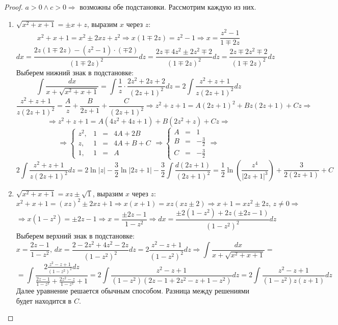 \documentclass[12pt]{article}
\theoremstyle{definition}
\DeclareMathOperator{\dint}{\displaystyle\int}
\begin{document}
\begin{proof}
	$a > 0 \wedge c > 0 \Rightarrow$ возможны обе подстановки. Рассмотрим каждую из них.
	\begin{enumerate}[label=(\arabic*)]
		\item $\sqrt{x^2 + x + 1 } = \pm x + z$, выразим $x$ через $z$:
		$$
			x^2 + x + 1 = x^2 \pm 2xz  + z^2 \Rightarrow x(1 \mp 2z) = z^2 - 1 \Rightarrow x = \dfrac{z^2 -1}{1 \mp 2z}
		$$
		$$	
			dx = \dfrac{2z(1 \mp2z) - (z^2 - 1){\cdot}(\mp 2)}{(1\mp2z)^2}dz = \dfrac{2z \mp 4z^2 \pm 2z^2 \mp 2}{(1 \mp 2z)^2}dz = \dfrac{2z \mp 2z^2  \mp 2}{(1 \mp 2z)^2}dz
		$$
		Выберем нижний знак в подстановке:
		$$
			\dint \dfrac{dx}{x + \sqrt{x^2 + x + 1 }} = \dint \dfrac{1}{z}{\cdot}\dfrac{2z^2 + 2z + 2}{(2z+1)^2}dz = 2\dint \dfrac{z^2 + z + 1}{z(2z+1)^2}dz
		$$
		$$
			\dfrac{z^2 + z + 1}{z(2z+1)^2} = \dfrac{A}{z} + \dfrac{B}{2z + 1} + \dfrac{C}{(2z + 1)^2} \Rightarrow z^2 + z + 1 = A(2z + 1)^2 + Bz(2z + 1) + Cz \Rightarrow
		$$
		$$
			\Rightarrow z^2 + z + 1 = A(4z^2 + 4z + 1) + B(2z^2 + z) + Cz \Rightarrow
		$$
		$$
			\Rightarrow \left\{
				\begin{matrix}
					z^2, & 1 &= & 4A + 2B\\
					z, & 1 &=& 4A + B  + C\\
					1, & 1 &=& A 
				\end{matrix}
			\right. \Rightarrow
			\left\{
				\begin{matrix}
					A & =& 1 \\[6pt]
					B & =& -\tfrac{3}{2}\\[6pt]
					C & =& -\tfrac{3}{2}
				\end{matrix}
			\right. \Rightarrow
		$$
		$$
			2\dint \dfrac{z^2 + z + 1}{z(2z+1)^2}dz = 2 \ln{|z|} - \dfrac{3}{2}\ln{|2z + 1|} -\dfrac{3}{2}\dint \dfrac{d(2z + 1)}{(2z+ 1)^2} = \dfrac{1}{2}\ln{\left(\dfrac{z^4}{|2z + 1|^3}\right)}  + \dfrac{3}{2(2z + 1)} +C
		$$
		\item $\sqrt{x^2 + x + 1} = xz \pm \sqrt{1}$, выразим $x$ через $z$:
		$$
			x^2 + x + 1 = (xz)^2 \pm 2xz + 1 \Rightarrow x(x + 1) = xz(xz \pm 2) \Rightarrow x + 1 = xz^2  \pm 2z, \, z \neq 0 \Rightarrow 
		$$
		$$
			\Rightarrow x(1 -z^2) = \pm 2z - 1 \Rightarrow x = \dfrac{\pm 2z - 1}{1 - z^2} \Rightarrow dx = \dfrac{\pm2(1-z^2) +2z(\pm 2z -1)}{(1-z^2)^2}dz
		$$
		Выберем верхний знак в подстановке:
		$$
			x = \dfrac{2z - 1}{1-z^2},\, dx = \dfrac{2- 2z^2 + 4z^2 - 2z}{(1-z^2)^2}dz = 2\dfrac{z^2 -z + 1}{(1-z^2)^2}dz \Rightarrow \dint \dfrac{dx}{x + \sqrt{x^2 + x + 1 }} =  
		$$	
		$$
			=\dint \dfrac{2\tfrac{z^2 -z + 1}{(1-z^2)^2}dz}{\tfrac{2z - 1}{1-z^2} + \tfrac{2z^2 - z}{1-z^2} + 1} = 2\dint \dfrac{z^2 -z + 1}{(1-z^2)(2z - 1 + 2z^2 - z + 1 - z^2)}dz = 2\dint \dfrac{z^2 -z + 1}{(1-z^2)z(z + 1)}dz 
		$$
		Далее уравнение решается обычным способом. Разница между решениями будет находится в $C$.
	\end{enumerate}
\end{proof}
\end{document}
